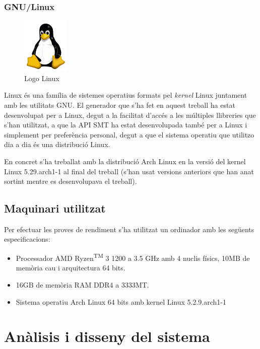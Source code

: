 \documentclass[11pt,a4paper,twoside]{report}
\begin{document}
  \subsection{GNU/Linux}
  \begin{figure}[ht!]
    \centering
    \includegraphics[width=0.2\textwidth]{Diagrames/Linux.png}
    \caption{Logo Linux}
    \label{fig:linux}
  \end{figure}
  Linux és una família de sistemes operatius formats pel \textit{kernel} Linux juntament amb les utilitats GNU. 
  El generador que s'ha fet en aquest treball ha estat desenvolupat per a Linux, degut a la facilitat d'accés a les múltiples llibreries que s'han utilitzat, a que la API SMT ha estat desenvolupada també per a Linux i simplement per preferència personal, degut a que el sistema operatiu que utilitzo dia a dia és una distribució Linux.

  En concret s'ha treballat amb la distribució Arch Linux en la versió del kernel Linux 5.29.arch1-1 al final del treball (s'han usat versions anteriors que han anat sortint mentre es desenvolupava el treball).


  \section{Maquinari utilitzat}
  Per efectuar les proves de rendiment s'ha utilitzat un ordinador amb les següents especificacions:
  \begin{itemize}
    \item Processador AMD Ryzen\textsuperscript{TM} 3 1200 a 3.5 GHz amb 4 nuclis físics,  10MB de memòria cau i arquitectura 64 bits.
    \item 16GB de memòria RAM DDR4 a 3333MT.
    \item Sistema operatiu Arch Linux 64 bits amb kernel Linux 5.2.9.arch1-1
  \end{itemize} 
  


  \chapter{Anàlisis i disseny del sistema}
\end{document}
